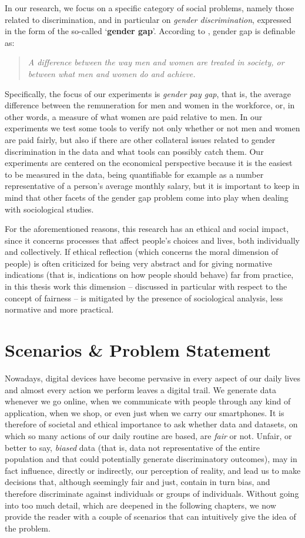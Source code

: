 In our research, we focus on a specific category of social problems, namely those related to discrimination, and in particular on \textit{gender discrimination}, expressed in the form of the so-called `\textbf{gender gap}'. According to \cite{cambridge2013gender}, gender gap is definable as:
\begin{quote}\emph{A difference between the way men and women are treated in society, or between what men and women do and achieve.} \cite{cambridge2013gender}\end{quote}

Specifically, the focus of our experiments is \textit{gender pay gap}, that is, the average difference between the remuneration for men and women in the workforce, or, in other words, a measure of what women are paid relative to men. In our experiments we test some tools to verify not only whether or not men and women are paid fairly, but also if there are other collateral issues related to gender discrimination in the data and what tools can possibly catch them.
Our experiments are centered on the economical perspective because it is the easiest to be measured in the data, being quantifiable for example as a number representative of a person's average monthly salary, but it is important to keep in mind that other facets of the gender gap problem come into play when dealing with sociological studies.

For the aforementioned reasons, this research has an ethical and social impact, since it concerns processes that affect people's choices and lives, both individually and collectively. If ethical reflection (which concerns the moral dimension of people) is often criticized for being very abstract and for giving normative indications (that is, indications on how people should behave) far from practice, in this thesis work this dimension -- discussed in particular with respect to the concept of fairness -- is mitigated by the presence of sociological analysis, less normative and more practical.


\section{Scenarios \& Problem Statement}
Nowadays, digital devices have become pervasive in every aspect of our daily lives and almost every action we perform leaves a digital trail. We generate data whenever we go online, when we communicate with people through any kind of application, when we shop, or even just when we carry our smartphones. It is therefore of societal and ethical importance to ask whether data and datasets, on which so many actions of our daily routine are based, are \textit{fair} or not. Unfair, or better to say, \textit{biased} data (that is, data not representative of the entire population and that could potentially generate discriminatory outcomes), may in fact influence, directly or indirectly, our perception of reality, and lead us to make decisions that, although seemingly fair and just, contain in turn bias, and therefore discriminate against individuals or groups of individuals. Without going into too much detail, which are deepened in the following chapters, we now provide the reader with a couple of scenarios that can intuitively give the idea of the problem.

